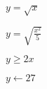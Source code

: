 \documentclass[12pt]{report}
\begin{document}
\newpage

\vspace*{\fill}
\begin{center}
	\(
	y = \sqrt{x}
	\)
\end{center}
\vfill

\vspace*{\fill}
\begin{center}
	\(
	y = \sqrt{\frac{x^2}{5}}
	\)
\end{center}
\vfill

\newpage

\vspace*{\fill}
\begin{center}
	\(
	y \geq 2x
	\)
\end{center}
\vfill

\vspace*{\fill}
\begin{center}
	\(
	y \leftarrow 27
	\)
\end{center}
\vfill
\end{document}
